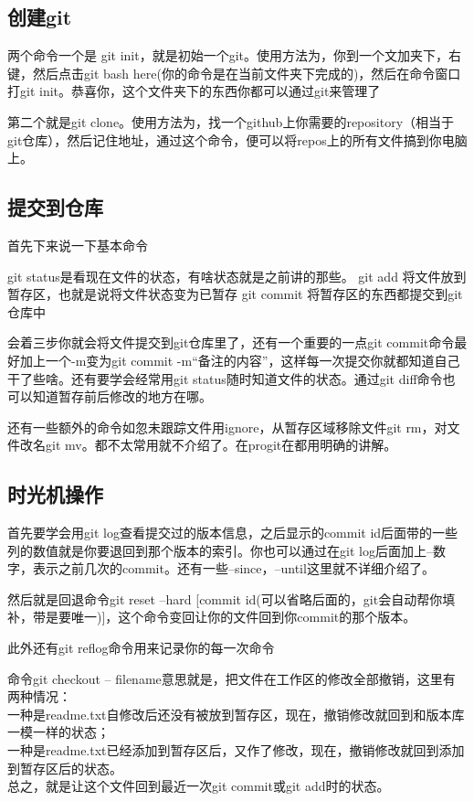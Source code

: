 \documentclass[12pt,a4paper]{article}
\begin{document}
	    \subsection{创建git}
	    两个命令一个是 git   init，就是初始一个git。使用方法为，你到一个文加夹下，右键，然后点击git bash here(你的命令是在当前文件夹下完成的)，然后在命令窗口打git init。恭喜你，这个文件夹下的东西你都可以通过git来管理了
	    
	    第二个就是git clone。使用方法为，找一个github上你需要的repository（相当于git仓库），然后记住地址，通过这个命令，便可以将repos上的所有文件搞到你电脑上。
	    \subsection{提交到仓库}
	    首先下来说一下基本命令
	    
	    git status是看现在文件的状态，有啥状态就是之前讲的那些。
	    git add 将文件放到暂存区，也就是说将文件状态变为已暂存
	    git commit 将暂存区的东西都提交到git仓库中
		
		会着三步你就会将文件提交到git仓库里了，还有一个重要的一点git commit命令最好加上一个-m变为git commit -m“备注的内容”，这样每一次提交你就都知道自己干了些啥。还有要学会经常用git status随时知道文件的状态。通过git diff命令也可以知道暂存前后修改的地方在哪。
		
		还有一些额外的命令如忽未跟踪文件用ignore，从暂存区域移除文件git rm，对文件改名git mv。都不太常用就不介绍了。在progit在都用明确的讲解。
		
		\subsection{时光机操作}
		首先要学会用git log查看提交过的版本信息，之后显示的commit id后面带的一些列的数值就是你要退回到那个版本的索引。你也可以通过在git log后面加上--数字，表示之前几次的commit。还有一些--since，--until这里就不详细介绍了。
		
		然后就是回退命令git reset --hard [commit id(可以省略后面的，git会自动帮你填补，带是要唯一)]，这个命令变回让你的文件回到你commit的那个版本。
		
		此外还有git reflog命令用来记录你的每一次命令
		
		命令git checkout -- filename意思就是，把文件在工作区的修改全部撤销，这里有两种情况：\\
		一种是readme.txt自修改后还没有被放到暂存区，现在，撤销修改就回到和版本库一模一样的状态；\\
		一种是readme.txt已经添加到暂存区后，又作了修改，现在，撤销修改就回到添加到暂存区后的状态。\\
		总之，就是让这个文件回到最近一次git commit或git add时的状态。
		
\end{document}
